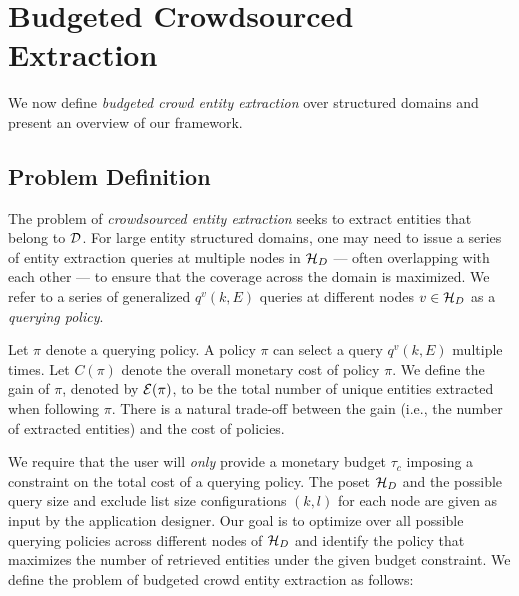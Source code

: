 \section{Budgeted Crowdsourced Extraction}
\label{sec:problem}
We now define {\em budgeted crowd entity extraction} over structured domains and present an overview of our framework.
\subsection{Problem Definition}
\label{sec:extraction}
The problem of {\em crowdsourced entity extraction} seeks to extract entities that belong to $\mathcal{D}$.  For large entity structured domains, one may need to issue a series of entity extraction queries at multiple nodes in  $\mathcal{H}_D$ --- often overlapping with each other --- to ensure that the coverage across the domain is maximized. We refer to a series of  generalized $q^v(k,E)$ queries at different nodes $v \in \mathcal{H}_D$ as a {\em querying policy}.

Let $\pi$ denote a querying policy. A policy $\pi$ can select a query $q^v(k,E)$ multiple times. Let $C(\pi)$ denote the overall monetary cost of policy $\pi$. We define the gain of $\pi$, denoted by $\mathcal{E}(\pi)$, to be the total number of unique entities extracted when following $\pi$. There is a natural trade-off between the gain (i.e., the number of extracted entities) and the cost of policies. 

We require that the user will {\em only} provide a monetary budget $\tau_c$ imposing a constraint on the total cost of a querying policy. The poset $\mathcal{H}_D$ and the possible query size and exclude list size configurations $(k,l)$ for each node are given as input by the application designer. Our goal is to optimize over all possible querying policies across different nodes of $\mathcal{H}_D$ and identify the policy that maximizes the number of retrieved entities under the given budget constraint. We define the problem of budgeted crowd entity extraction as follows:


